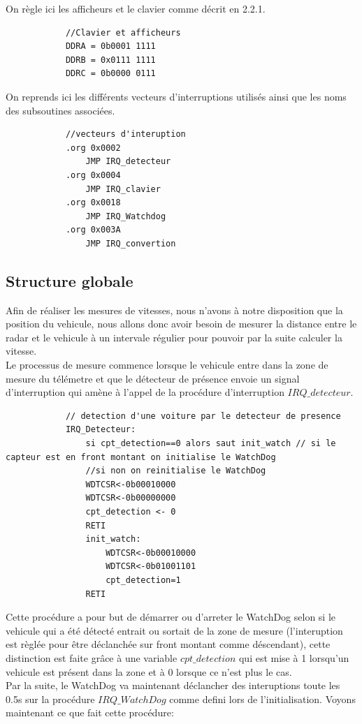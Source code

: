\documentclass[a4paper, 12pt]{article}
\begin{document}
		On règle ici les afficheurs et le clavier comme décrit en 2.2.1.
		\begin{lstlisting}
			//Clavier et afficheurs
			DDRA = 0b0001 1111
			DDRB = 0x0111 1111
			DDRC = 0b0000 0111
		\end{lstlisting}

		On reprends ici les différents vecteurs d'interruptions utilisés ainsi que les noms des subsoutines associées.
		\begin{lstlisting}
			//vecteurs d'interuption
			.org 0x0002
				JMP IRQ_detecteur
			.org 0x0004
				JMP IRQ_clavier
			.org 0x0018
				JMP IRQ_Watchdog
			.org 0x003A
				JMP IRQ_convertion
		\end{lstlisting}
		\subsection{Structure globale}
		Afin de réaliser les mesures de vitesses, nous n'avons à notre disposition que la position du vehicule, nous allons donc avoir besoin de mesurer la distance entre le radar et le vehicule à un intervale régulier pour pouvoir par la suite calculer la vitesse. \\
		Le processus de mesure commence lorsque le vehicule entre dans la zone de mesure du télémetre et que le détecteur de présence envoie un signal d'interruption qui amène à l'appel de la procédure d'interruption $IRQ\_detecteur$.
		
		\begin{lstlisting}
			// detection d'une voiture par le detecteur de presence  
			IRQ_Detecteur:
				si cpt_detection==0 alors saut init_watch // si le capteur est en front montant on initialise le WatchDog
				//si non on reinitialise le WatchDog 
				WDTCSR<-0b00010000
				WDTCSR<-0b00000000
				cpt_detection <- 0 
				RETI
				init_watch: 
					WDTCSR<-0b00010000
					WDTCSR<-0b01001101
					cpt_detection=1
				RETI
		\end{lstlisting}
		Cette procédure a pour but de démarrer ou d'arreter le WatchDog selon si le vehicule qui a été détecté entrait ou sortait de la zone de mesure (l'interuption est règlée pour être déclanchée sur front montant comme déscendant), cette distinction est faite grâce à une variable $cpt\_detection$ qui est mise à 1 lorsqu'un vehicule est présent dans la zone et à 0 lorsque ce n'est plus le cas.\\
		
		Par la suite, le WatchDog va maintenant déclancher des interuptions toute les 0.5s sur la procédure $IRQ\_WatchDog$ comme defini lors de l'initialisation. Voyons maintenant ce que fait cette procédure:\\
		
\end{document}
